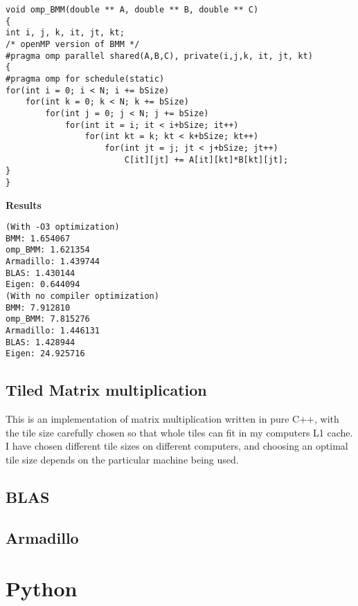 \begin{center}
\begin{lstlisting}
void omp_BMM(double ** A, double ** B, double ** C)
{
int i, j, k, it, jt, kt;
/* openMP version of BMM */
#pragma omp parallel shared(A,B,C), private(i,j,k, it, jt, kt)
{
#pragma omp for schedule(static)
for(int i = 0; i < N; i += bSize)
	for(int k = 0; k < N; k += bSize)
		for(int j = 0; j < N; j += bSize)
			for(int it = i; it < i+bSize; it++)
				for(int kt = k; kt < k+bSize; kt++)
					for(int jt = j; jt < j+bSize; jt++)
						C[it][jt] += A[it][kt]*B[kt][jt];
}
}

\end{lstlisting}
\textbf{Results}
\begin{lstlisting}
(With -O3 optimization)
BMM: 1.654067
omp_BMM: 1.621354 
Armadillo: 1.439744
BLAS: 1.430144
Eigen: 0.644094
(With no compiler optimization)
BMM: 7.912810
omp_BMM: 7.815276 
Armadillo: 1.446131
BLAS: 1.428944
Eigen: 24.925716

\end{lstlisting}
\end{center}

\subsection{Tiled Matrix multiplication}
This is an implementation of matrix multiplication written in pure C++, with the tile size carefully chosen so that whole tiles can fit in my computers L1 cache. I have chosen different tile sizes on different computers, and choosing an optimal tile size depends on the particular machine being used. 
\subsection{BLAS}
\subsection{Armadillo}
\section{Python}
